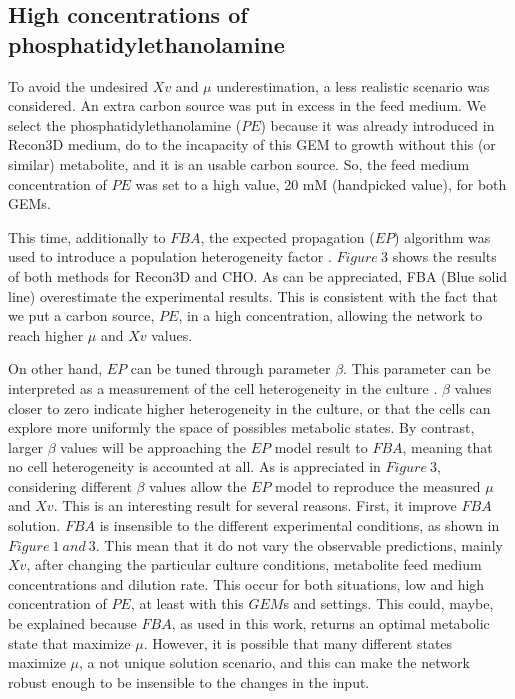 \subsection{High concentrations of phosphatidylethanolamine}

	To avoid the undesired $Xv$ and $\mu$ underestimation, a less realistic scenario was considered. An extra carbon source was put in excess in the feed medium. We select the phosphatidylethanolamine ($PE$) because it was already introduced in Recon3D medium, do to the incapacity of this GEM to growth without this (or similar) metabolite, and it is an usable carbon source. So, the feed medium concentration of	$PE$ was set to a high value, 20 mM (handpicked value), for both GEMs. 
 	
 	This time, additionally to $FBA$, the expected propagation ($EP$) algorithm was used to introduce a population heterogeneity factor \cite{Fernandez-de-Cossio-Diaz2018b}. $Figure\ 3$ shows the results of both methods for Recon3D and CHO. As can be appreciated, FBA (Blue solid line) overestimate the experimental results. This is consistent with the fact that we put a carbon source, $PE$, in a high concentration, allowing the network to reach higher $\mu$ and $Xv$ values.
 	
  	On other hand, $EP$ can be tuned through parameter $\beta$. This parameter can be interpreted as a measurement of the cell heterogeneity in the culture \cite{Fernandez-de-Cossio-Diaz2018b}. $\beta$ values closer to zero indicate higher heterogeneity in the culture, or that the cells can explore more uniformly the space of possibles metabolic states. By contrast, larger $\beta$ values will be approaching the $EP$ model result to $FBA$, meaning that no cell heterogeneity is accounted at all. As is appreciated in $Figure\ 3$, considering different $\beta$ values allow the $EP$ model to reproduce the measured $\mu$ and $Xv$. This is an interesting result for several reasons. First, it improve $FBA$ solution. $FBA$ is insensible to the different experimental conditions, as shown in $Figure\ 1\ and\ 3$. This mean that it do not vary the observable predictions, mainly $Xv$, after changing the particular culture conditions, metabolite feed medium concentrations and dilution rate. This occur for both situations, low and high concentration of $PE$, at least with this $GEM$s and settings. This could, maybe, be explained because $FBA$, as used in this work, returns an optimal metabolic state that maximize $\mu$. However, it is possible that many different states maximize $\mu$, a not unique solution scenario, and this can make the network robust enough to be insensible to the changes in the input. 
  	
